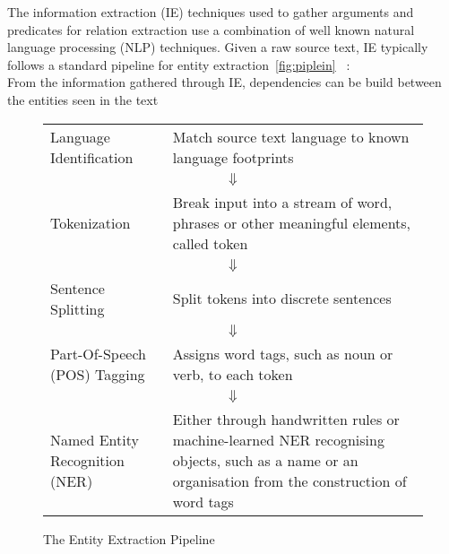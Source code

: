 \documentclass[bsc,frontabs,twoside,singlespacing,parskip,deptreport]{infthesis}     %
\begin{document}
The information extraction (IE) techniques used to gather arguments and predicates for relation extraction use a combination
of well known natural language processing (NLP) techniques. 
Given a raw source text, IE typically follows a standard pipeline for entity extraction~\ref{fig:piplein} ~\cite{bontcheva2013twitie}:\\
From the information gathered through IE, dependencies can be build between the entities seen in the text
\begin{figure}
\begin{tcolorbox}[width=\textwidth,
                  interior hidden,
                  boxsep=10pt,
                  left=0pt,
                  right=0pt,
                  top=2pt]

 \begin{tabularx}{\linewidth}{lX}

 Language Identification &  Match source text language to known language footprints\vspace{1em}\\
  \multicolumn{2}{c}{$\Downarrow$} \\
 Tokenization &  Break input into a stream of word, phrases or other meaningful elements, called token\vspace{1em}\\

  \multicolumn{2}{c}{$\Downarrow$} \\
 Sentence Splitting &  Split tokens into discrete sentences\vspace{1em}\\

  \multicolumn{2}{c}{$\Downarrow$} \\
 Part-Of-Speech (POS) Tagging &   Assigns word tags, such as noun or verb, to each token\vspace{1em} \\

  \multicolumn{2}{c}{$\Downarrow$} \\
 Named Entity Recognition (NER) &   Either through handwritten rules or machine-learned NER recognising objects, such as a name or an
    organisation from the construction of word tags

 \end{tabularx}
\end{tcolorbox}
\caption{The Entity Extraction Pipeline}
\label{fig:pipeline}
\end{figure}
\end{document}
